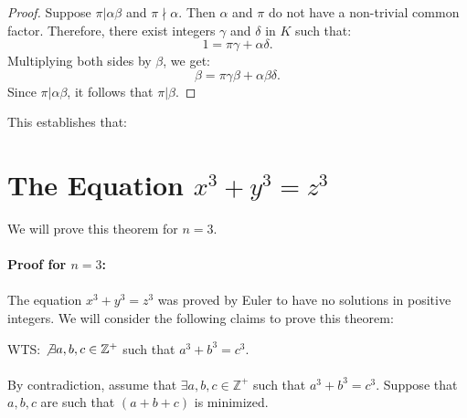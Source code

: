 \documentclass{article}
\begin{document}

\begin{proof}
Suppose \( \pi | \alpha \beta \) and \( \pi \nmid \alpha \). Then \( \alpha \) and \( \pi \) do not have a non-trivial common factor. Therefore, there exist integers \( \gamma \) and \( \delta \) in \( K \) such that:
\[
1 = \pi \gamma + \alpha \delta.
\]
Multiplying both sides by \( \beta \), we get:
\[
\beta = \pi \gamma \beta + \alpha \beta \delta.
\]
Since \( \pi | \alpha \beta \), it follows that \( \pi | \beta \).
\end{proof}

This establishes that:



\section{The Equation $x^3 + y^3 = z^3$}


We will prove this theorem for $n = 3$.\\\\
\textbf{Proof for $n = 3$:} \\\\
The equation \( x^3 + y^3 = z^3 \) was proved by Euler to have no solutions in positive integers. We will consider the following claims to prove this theorem:

WTS: $\not\exists a, b, c \in \mathbb{Z}^+$ such that $a^3 + b^3 = c^3$.\\\\
By contradiction, assume that $\exists a, b, c \in \mathbb{Z}^+$ such that $a^3 + b^3 = c^3$. Suppose that \(a, b, c\) are such that \((a + b + c)\) is minimized.\\\\
\end{document}
